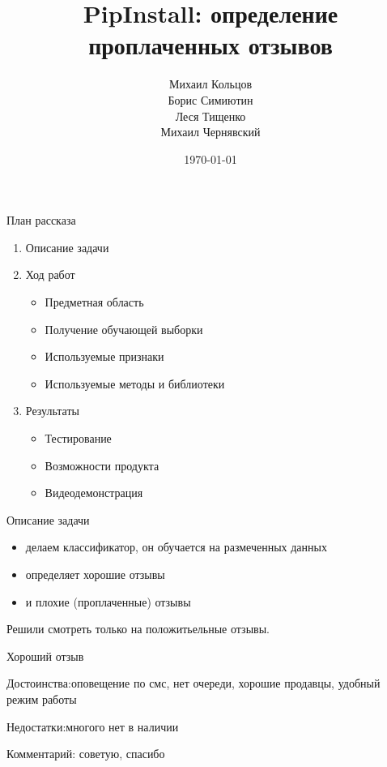 \documentclass[mathserif,utf8,14pt]{beamer}
\title{PipInstall: определение проплаченных отзывов}
\author{Михаил Кольцов \\ Борис Симиютин \\ Леся Тищенко \\ Михаил Чернявский}
\date{\today}
\begin{document}
\begin{frame}
    \maketitle
\end{frame}

\begin{frame}{План рассказа}
    \begin{enumerate}
        \item Описание задачи
        \item Ход работ
            \begin{itemize}
                \item Предметная область
                \item Получение обучающей выборки
                \item Используемые признаки
                \item Используемые методы и библиотеки
            \end{itemize}
        \item Результаты
            \begin{itemize}
                \item Тестирование
                \item Возможности продукта
                \item Видеодемонстрация
            \end{itemize}
    \end{enumerate}
\end{frame}

\begin{frame}{Описание задачи}
    \begin{itemize}
        \item делаем классификатор, он обучается на размеченных данных
        \item определяет хорошие отзывы
        \item и плохие (проплаченные) отзывы
    \end{itemize}
    Решили смотреть только на положитьельные отзывы.
\end{frame}

\begin{frame}{Хороший отзыв}
     \addtocounter{framenumber}{-1}
    Достоинства:оповещение по смс, нет очереди, хорошие продавцы, удобный режим работы

    Недостатки:многого нет в наличии

    Комментарий: советую, спасибо
\end{frame}
\end{document}
